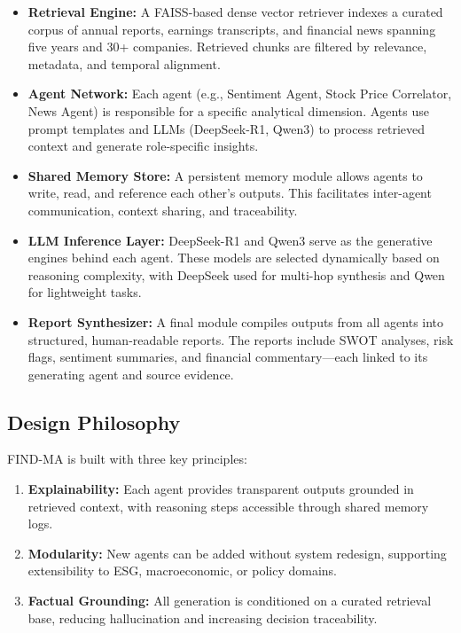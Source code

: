 \documentclass[11pt]{article}
\begin{document}
\begin{itemize}
    \item \textbf{Retrieval Engine:} A FAISS-based dense vector retriever indexes a curated corpus of annual reports, earnings transcripts, and financial news spanning five years and 30+ companies. Retrieved chunks are filtered by relevance, metadata, and temporal alignment.
    
    \item \textbf{Agent Network:} Each agent (e.g., Sentiment Agent, Stock Price Correlator, News Agent) is responsible for a specific analytical dimension. Agents use prompt templates and LLMs (DeepSeek-R1, Qwen3) to process retrieved context and generate role-specific insights.

    \item \textbf{Shared Memory Store:} A persistent memory module allows agents to write, read, and reference each other’s outputs. This facilitates inter-agent communication, context sharing, and traceability.

    \item \textbf{LLM Inference Layer:} DeepSeek-R1 and Qwen3 serve as the generative engines behind each agent. These models are selected dynamically based on reasoning complexity, with DeepSeek used for multi-hop synthesis and Qwen for lightweight tasks.

    \item \textbf{Report Synthesizer:} A final module compiles outputs from all agents into structured, human-readable reports. The reports include SWOT analyses, risk flags, sentiment summaries, and financial commentary—each linked to its generating agent and source evidence.
\end{itemize}

\subsection*{Design Philosophy}

FIND-MA is built with three key principles:

\begin{enumerate}
    \item \textbf{Explainability:} Each agent provides transparent outputs grounded in retrieved context, with reasoning steps accessible through shared memory logs.
    \item \textbf{Modularity:} New agents can be added without system redesign, supporting extensibility to ESG, macroeconomic, or policy domains.
    \item \textbf{Factual Grounding:} All generation is conditioned on a curated retrieval base, reducing hallucination and increasing decision traceability.
\end{enumerate}
\end{document}
